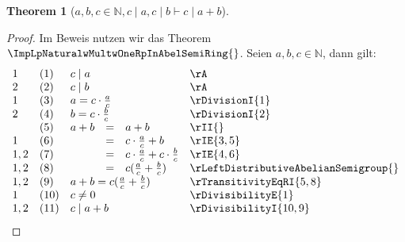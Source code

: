 \documentclass{book}
\theoremstyle{plain}
\newtheorem{theorem}{Theorem}
\theoremstyle{remark}
\theoremstyle{definition}
\begin{document}
\label{awbwcInNaturalwcMidawcMidbImpcMidLbaPlusbRb}
\begin{theorem}[\(a,b,c\in\mathbb{N}, c\mid a, c\mid b\vdash c\mid{a+b}\)]
\end{theorem}
\begin{proof}
Im Beweis nutzen wir das Theorem \(\ImpLpNaturalwMultwOneRpInAbelSemiRing{}\). 
Seien \(a,b,c\in\mathbb{N}\), dann gilt:
        \[
	\begin{array}{lllcll}
            1       &  (1)  & \multicolumn{3}{l}{c\mid a} & \rA \\
            2       &  (2)  & \multicolumn{3}{l}{c\mid b} & \rA \\
            1       &  (3)  & \multicolumn{3}{l}{a=c\cdot \frac{a}{c}} & \rDivisionI{1}  \\
            2       &  (4)  & \multicolumn{3}{l}{b=c\cdot \frac{b}{c}} & \rDivisionI{2}  \\
                    &  (5)  & a+b&=&a+b & \rII{}  \\
            1       &  (6)  & &=&c\cdot \frac{a}{c}+b & \rIE{3,5}  \\
            1,2     &  (7)  & &=&c\cdot \frac{a}{c}+c\cdot \frac{b}{c} & \rIE{4,6}  \\
            1,2     &  (8)  & &=&c(\frac{a}{c}+\frac{b}{c}) & \rLeftDistributiveAbelianSemigroup{}  \\
            1,2     &  (9) & \multicolumn{3}{l}{a+b=c(\frac{a}{c}+\frac{b}{c})} & \rTransitivityEqRI{5,8}  \\
            1     &  (10) & \multicolumn{3}{l}{c\neq 0} & \rDivisibilityE{1}  \\
            1,2   &  (11) & \multicolumn{3}{l}{c\mid{a+b}} & \rDivisibilityI{10,9}  \\
        \end{array}
	\]
\end{proof}
\end{document}
